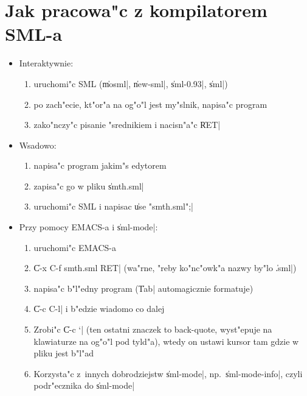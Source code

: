 \chapter{
Jak pracowa"c z kompilatorem SML-a}

\begin{itemize}

\item Interaktywnie:
\begin{enumerate}
\item uruchomi"c SML (\|mosml|, \|new-sml|, \|sml-0.93|, \|sml|)
\item po zach"ecie, kt"or"a na og"o"l jest my"slnik, napisa"c program
\item zako"nczy"c pisanie "srednikiem i nacisn"a"c \|RET|
\end{enumerate}

\item Wsadowo: 

\begin{enumerate}
\item napisa"c program jakim"s edytorem
\item zapisa"c go w pliku \|smth.sml|
\item uruchomi"c SML i napisac \|use "smth.sml";|
\end{enumerate}

\item Przy pomocy EMACS-a i \|sml-mode|:

\begin{enumerate}
\item uruchomi"c EMACS-a
\item \|C-x C-f smth.sml RET| (wa"rne, "reby ko"nc"owk"a nazwy by"lo \|.sml|)
\item napisa"c b"l"edny program (\|Tab| automagicznie formatuje)
\item \|C-c C-l| i b"edzie wiadomo co dalej
\item Zrobi"c \|C-c `| (ten ostatni znaczek to back-quote, 
      wyst"epuje na klawiaturze na og"o"l pod tyld"a), 
      wtedy on ustawi kursor tam gdzie w pliku jest b"l"ad 
\item Korzysta"c z~innych dobrodziejstw \|sml-mode|,
      np.\ \|sml-mode-info|, czyli podr"ecznika do \|sml-mode|
\end{enumerate}

\end{itemize}

